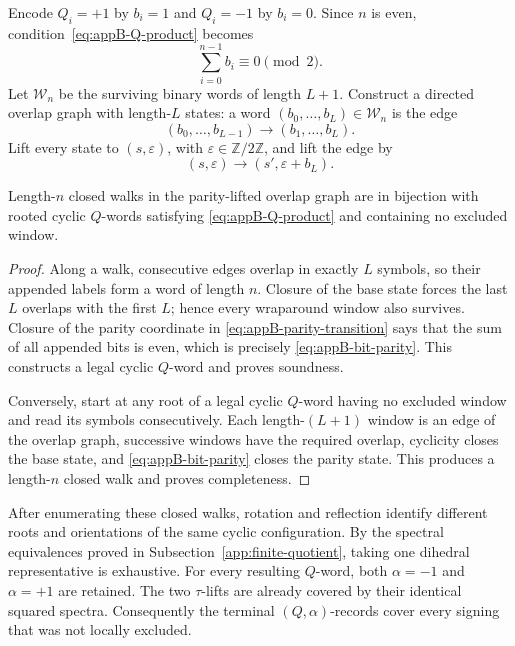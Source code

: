 Encode \(Q_i=+1\) by \(b_i=1\) and \(Q_i=-1\) by \(b_i=0\).  Since \(n\)
is even, condition~\eqref{eq:appB-Q-product} becomes
\begin{equation}\label{eq:appB-bit-parity}
 \sum_{i=0}^{n-1}b_i\equiv0\pmod2.
\end{equation}
Let \(\mathcal W_n\) be the surviving binary words of length \(L+1\).
Construct a directed overlap graph with length-\(L\) states: a word
\((b_0,\ldots,b_L)\in\mathcal W_n\) is the edge
\[
 (b_0,\ldots,b_{L-1})
 \longrightarrow(b_1,\ldots,b_L).
\]
Lift every state to \((s,\varepsilon)\), with
\(\varepsilon\in\mathbb Z/2\mathbb Z\), and lift the edge by
\begin{equation}\label{eq:appB-parity-transition}
 (s,\varepsilon)\longrightarrow
 (s',\varepsilon+b_L).
\end{equation}

\begin{lemma}
\label{lem:appB-debruijn-completeness}
Length-\(n\) closed walks in the parity-lifted overlap graph are in
bijection with rooted cyclic \(Q\)-words satisfying
\eqref{eq:appB-Q-product} and containing no excluded window.
\end{lemma}

\begin{proof}
Along a walk, consecutive edges overlap in exactly \(L\) symbols, so their
appended labels form a word of length \(n\).  Closure of the base state
forces the last \(L\) overlaps with the first \(L\); hence every wraparound
window also survives.  Closure of the parity coordinate in
\eqref{eq:appB-parity-transition} says that the sum of all appended bits is
even, which is precisely \eqref{eq:appB-bit-parity}.  This constructs a
legal cyclic \(Q\)-word and proves soundness.

Conversely, start at any root of a legal cyclic \(Q\)-word having no
excluded window and read its symbols consecutively.  Each length-\((L+1)\)
window is an edge of the overlap graph, successive windows have the required
overlap, cyclicity closes the base state, and
\eqref{eq:appB-bit-parity} closes the parity state.  This produces a
length-\(n\) closed walk and proves completeness.
\end{proof}

After enumerating these closed walks, rotation and reflection identify
different roots and orientations of the same cyclic configuration.  By the
spectral equivalences proved in Subsection~\ref{app:finite-quotient}, taking
one dihedral representative is exhaustive.  For every resulting \(Q\)-word,
both \(\alpha=-1\) and \(\alpha=+1\) are retained.  The two \(\tau\)-lifts
are already covered by their identical squared spectra.  Consequently the
terminal \((Q,\alpha)\)-records cover every signing that was not locally
excluded.

